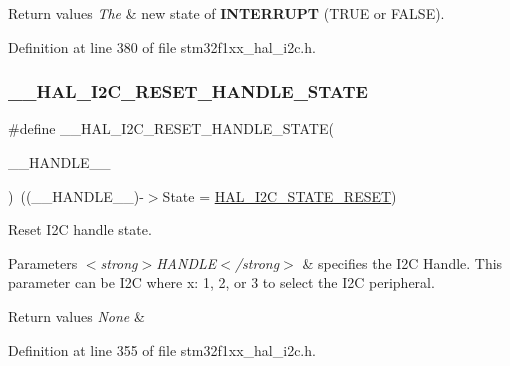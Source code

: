 \begin{DoxyRetVals}{Return values}
{\em The} & new state of {\bfseries I\+N\+T\+E\+R\+R\+U\+PT} (T\+R\+UE or F\+A\+L\+SE). \\
\hline
\end{DoxyRetVals}


Definition at line 380 of file stm32f1xx\+\_\+hal\+\_\+i2c.\+h.

\mbox{\label{group___i2_c___exported___macros_ga74c8fd72a78882720c28448ce8bd33d8}} 
\subsubsection{\texorpdfstring{\+\_\+\+\_\+\+H\+A\+L\+\_\+\+I2\+C\+\_\+\+R\+E\+S\+E\+T\+\_\+\+H\+A\+N\+D\+L\+E\+\_\+\+S\+T\+A\+TE}{\_\_HAL\_I2C\_RESET\_HANDLE\_STATE}}
{\footnotesize\ttfamily \#define \+\_\+\+\_\+\+H\+A\+L\+\_\+\+I2\+C\+\_\+\+R\+E\+S\+E\+T\+\_\+\+H\+A\+N\+D\+L\+E\+\_\+\+S\+T\+A\+TE(\begin{DoxyParamCaption}\item[{}]{\+\_\+\+\_\+\+H\+A\+N\+D\+L\+E\+\_\+\+\_\+ }\end{DoxyParamCaption})~((\+\_\+\+\_\+\+H\+A\+N\+D\+L\+E\+\_\+\+\_\+)-\/$>$State = \hyperlink{group___i2_c___exported___types_ggaef355af8eab251ae2a19ee164ad81c37a91ba08634e08d7287940f1bc5a37eeff}{H\+A\+L\+\_\+\+I2\+C\+\_\+\+S\+T\+A\+T\+E\+\_\+\+R\+E\+S\+ET})}



Reset I2C handle state. 


\begin{DoxyParams}{Parameters}
{\em $<$strong$>$\+H\+A\+N\+D\+L\+E$<$/strong$>$} & specifies the I2C Handle. This parameter can be I2C where x\+: 1, 2, or 3 to select the I2C peripheral. \\
\hline
\end{DoxyParams}

\begin{DoxyRetVals}{Return values}
{\em None} & \\
\hline
\end{DoxyRetVals}


Definition at line 355 of file stm32f1xx\+\_\+hal\+\_\+i2c.\+h.


